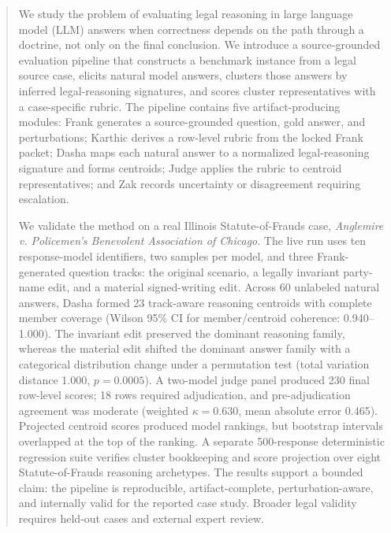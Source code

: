 \begin{abstract}
We study the problem of evaluating legal reasoning in large language model
(LLM) answers when correctness depends on the path through a doctrine, not only
on the final conclusion. We introduce a source-grounded evaluation pipeline that
constructs a benchmark instance from a legal source case, elicits natural model
answers, clusters those answers by inferred legal-reasoning signatures, and
scores cluster representatives with a case-specific rubric. The pipeline
contains five artifact-producing modules: Frank generates a source-grounded
question, gold answer, and perturbations; Karthic derives a row-level rubric
from the locked Frank packet; Dasha maps each natural answer to a normalized
legal-reasoning signature and forms centroids; Judge applies the rubric to
centroid representatives; and Zak records uncertainty or disagreement requiring
escalation.

We validate the method on a real Illinois Statute-of-Frauds case,
\emph{Anglemire v. Policemen's Benevolent Association of Chicago}. The live run
uses ten response-model identifiers, two samples per model, and three
Frank-generated question tracks: the original scenario, a legally invariant
party-name edit, and a material signed-writing edit. Across 60 unlabeled
natural answers, Dasha formed 23 track-aware reasoning centroids with complete
member coverage (Wilson 95\% CI for member/centroid coherence:
0.940--1.000). The invariant edit preserved the dominant reasoning family,
whereas the material edit shifted the dominant answer family with a categorical
distribution change under a permutation test (total variation distance 1.000,
\(p=0.0005\)). A two-model judge panel produced 230 final row-level scores;
18 rows required adjudication, and pre-adjudication agreement was moderate
(weighted \(\kappa=0.630\), mean absolute error 0.465). Projected centroid
scores produced model rankings, but bootstrap intervals overlapped at the top
of the ranking. A separate 500-response deterministic regression suite verifies
cluster bookkeeping and score projection over eight Statute-of-Frauds reasoning
archetypes. The results support a bounded claim: the pipeline is reproducible,
artifact-complete, perturbation-aware, and internally valid for the reported
case study. Broader legal validity requires held-out cases and external expert
review.
\end{abstract}
